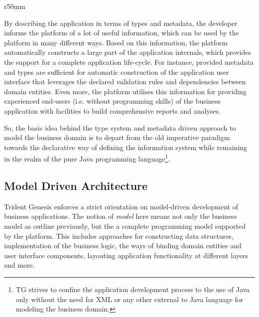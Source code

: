   \begin{wrapfigure}{r}{50mm}
    \vspace{-30pt}
    \centering    
    \vspace{-30pt}
  \end{wrapfigure}

  By describing the application in terms of types and metadata, the developer informs the platform of a lot of useful information, which can be used by the platform in many different ways.
  Based on this information, the platform automatically constructs a large part of the application internals, which provides the support for a complete application life-cycle.
  For instance, provided metadata and types are sufficient for automatic construction of the application user interface that leverages the declared validation rules and dependencies between domain entities.
  Even more, the platform utilises this information for providing experienced end-users (i.e. without programming skills) of the business application with facilities to build comprehensive reports and analyses.

  So, the basic idea behind the type system and metadata driven approach to model the business domain is to depart from the old imperative paradigm towards the declarative way of defining the information system while remaining in the realm of the pure Java programming language\footnote{TG strives to confine the application development process to the use of Java only without the need for XML or any other external to Java language for modeling the business domain.}.
  
  \subsection{Model Driven Architecture}
  Trident Genesis enforces a strict orientation on model-driven development of business applications.
  The notion of \emph{model} here means not only the business model as outline previously, but the a complete programming model supported by the platform.
  This includes approaches for constructing data structures, implementation of the business logic, the ways of binding domain entities and user interface components, layouting application functionality at different layers and more.

